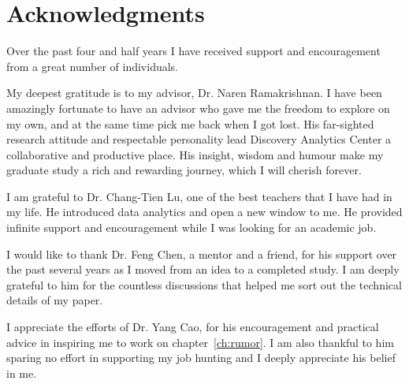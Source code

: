 \documentclass[12pt,dvips]{report}
\begin{document}
\vfill



\pagebreak


\chapter*{Acknowledgments}
Over the past four and half years I have received support and encouragement from a great number of individuals.

My deepest gratitude is to my advisor, Dr. Naren Ramakrishnan. I have been amazingly fortunate to have an advisor who gave me the freedom to explore on my own, and at the same time pick me back when I got lost. His far-sighted research attitude and respectable personality lead Discovery Analytics Center a collaborative and productive place. His insight, wisdom and humour make my graduate study a rich and rewarding journey, which I will cherish forever.

I am grateful to Dr. Chang-Tien Lu, one of the best teachers that I have had in my life. He introduced data analytics and open a new window to me. He provided infinite support and encouragement while I was looking for an academic job.

I would like to thank Dr. Feng Chen, a mentor and a friend, for his support over the past several years as I moved from an idea to a completed study. I am deeply grateful to him for the countless discussions that helped me sort out the technical details of my paper.

I appreciate the efforts of Dr. Yang Cao, for his encouragement and practical advice in inspiring me to work on chapter~\ref{ch:rumor}. I am also thankful to him sparing no effort in supporting my job hunting and I deeply appreciate his belief in me.
\end{document}
